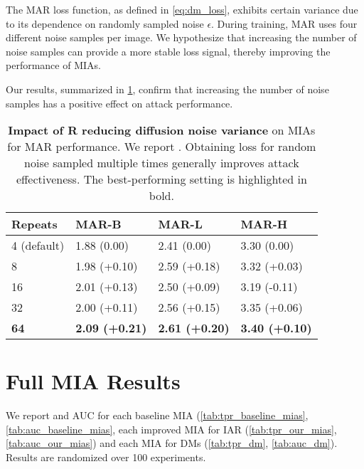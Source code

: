 The MAR loss function, as defined in \cref{eq:dm_loss}, exhibits certain variance due to its dependence on randomly sampled noise $\epsilon$. During training, MAR uses four different noise samples per image. We hypothesize that increasing the number of noise samples can provide a more stable loss signal, thereby improving the performance of MIAs.  

Our results, summarized in \cref{tab:mul}, confirm that increasing the number of noise samples has a positive effect on attack performance. 






\begin{table}[h!]
    \centering
    \scriptsize
    \caption{\textbf{Impact of R
    reducing diffusion noise variance} on MIAs for MAR performance. We report \tprat. Obtaining loss for random noise sampled multiple times generally improves attack effectiveness. The best-performing setting is highlighted in bold.}
    \label{tab:mul}
\begin{tabular}{llll}
\toprule
Repeats & MAR-B & MAR-L & MAR-H \\
\midrule
4 (default) & 1.88 (0.00) & 2.41 (0.00) & 3.30 (0.00) \\
8 & 1.98 (+0.10) & 2.59 (+0.18) & 3.32 (+0.03) \\
16 & 2.01 (+0.13) & 2.50 (+0.09) & 3.19 (-0.11) \\
32 & 2.00 (+0.11) & 2.56 (+0.15) & 3.35 (+0.06) \\
\textbf{64} & \textbf{2.09 (+0.21)} &\textbf{ 2.61 (+0.20)} & \textbf{3.40 (+0.10)} \\

\bottomrule
\end{tabular}
\end{table}

\section{Full MIA Results}
\label{app:full_mia}
We report \tprat and AUC for each baseline MIA (\cref{tab:tpr_baseline_mias}, \cref{tab:auc_baseline_mias}, each improved MIA for IAR (\cref{tab:tpr_our_mias}, \cref{tab:auc_our_mias}) and each MIA for DMs (\cref{tab:tpr_dm}, \cref{tab:auc_dm}). Results are randomized over 100 experiments.

